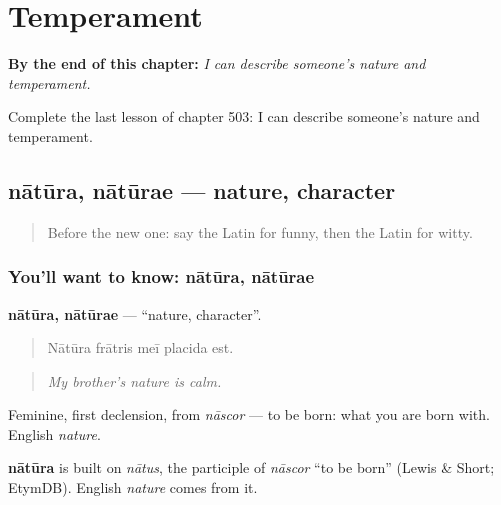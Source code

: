 
\chapter{Temperament}
\label{ch:la-temperament}

\begin{chapteropening}
\textbf{By the end of this chapter:} \emph{I can describe someone's nature and temperament.}

Complete the last lesson of chapter 503: I can describe someone's nature and temperament.
\end{chapteropening}

\section[nātūra, nātūrae]{nātūra, nātūrae — nature, character}

\label{lesson:LA-C503-natura}



\begin{quote}
Before the new one: say the Latin for funny, then the Latin for witty.
\end{quote}

\subsection*{You'll want to know: nātūra, nātūrae}
\textbf{nātūra, nātūrae} — \textquotedblleft{}nature, character\textquotedblright{}.

\begin{quote}
Nātūra frātris meī placida est.
\end{quote}

\begin{quote}
\emph{My brother's nature is calm.}
\end{quote}

Feminine, first declension, from \emph{nāscor} — to be born: what you are born with. English \emph{nature}.

\begin{cousinweb}
\textbf{nātūra} is built on \emph{nātus}, the participle of \emph{nāscor} \textquotedblleft{}to be born\textquotedblright{} (Lewis \& Short; EtymDB). English \emph{nature} comes from it.
\end{cousinweb}

